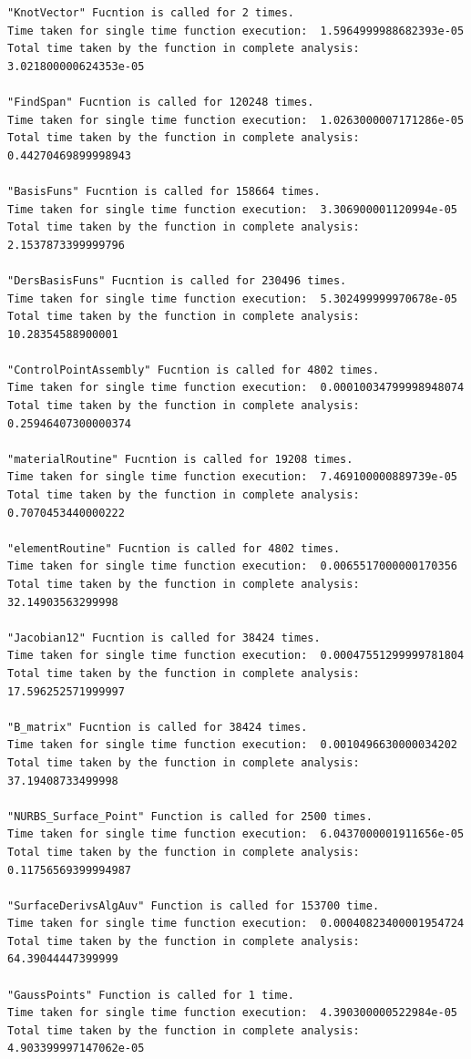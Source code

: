 \documentclass[11pt]{article}
\begin{document}
\begin{verbatim}
"KnotVector" Fucntion is called for 2 times.
Time taken for single time function execution:  1.5964999988682393e-05
Total time taken by the function in complete analysis:  3.021800000624353e-05

"FindSpan" Fucntion is called for 120248 times.
Time taken for single time function execution:  1.0263000007171286e-05
Total time taken by the function in complete analysis:  0.44270469899998943

"BasisFuns" Fucntion is called for 158664 times.
Time taken for single time function execution:  3.306900001120994e-05
Total time taken by the function in complete analysis:  2.1537873399999796

"DersBasisFuns" Fucntion is called for 230496 times.
Time taken for single time function execution:  5.302499999970678e-05
Total time taken by the function in complete analysis:  10.28354588900001

"ControlPointAssembly" Fucntion is called for 4802 times.
Time taken for single time function execution:  0.00010034799998948074
Total time taken by the function in complete analysis:  0.25946407300000374

"materialRoutine" Fucntion is called for 19208 times.
Time taken for single time function execution:  7.469100000889739e-05
Total time taken by the function in complete analysis:  0.7070453440000222

"elementRoutine" Fucntion is called for 4802 times.
Time taken for single time function execution:  0.0065517000000170356
Total time taken by the function in complete analysis:  32.14903563299998

"Jacobian12" Fucntion is called for 38424 times.
Time taken for single time function execution:  0.00047551299999781804
Total time taken by the function in complete analysis:  17.596252571999997

"B_matrix" Fucntion is called for 38424 times.
Time taken for single time function execution:  0.0010496630000034202
Total time taken by the function in complete analysis:  37.19408733499998

"NURBS_Surface_Point" Function is called for 2500 times.
Time taken for single time function execution:  6.0437000001911656e-05
Total time taken by the function in complete analysis:  0.11756569399994987

"SurfaceDerivsAlgAuv" Function is called for 153700 time.
Time taken for single time function execution:  0.00040823400001954724
Total time taken by the function in complete analysis:  64.39044447399999

"GaussPoints" Function is called for 1 time.
Time taken for single time function execution:  4.390300000522984e-05
Total time taken by the function in complete analysis:  4.903399997147062e-05
\end{verbatim}
\newpage
\end{document}
